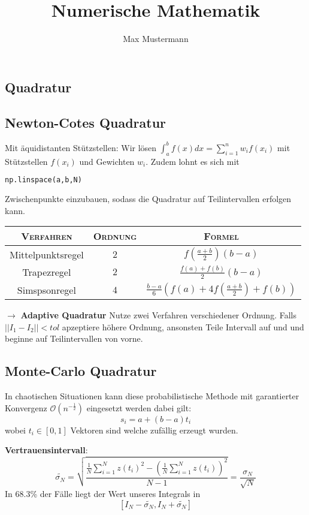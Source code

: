\documentclass{sciposter}
\title{\huge{Numerische Mathematik}}
\author{\large{Max Mustermann}}
\newcommand*\widefbox[1]{\fbox{\hspace{2em}#1\hspace{2em}}}
\begin{document}
\maketitle




\begin{multicols}{3}

\section{Quadratur}
\subsection*{Newton-Cotes Quadratur}
Mit äquidistanten Stützstellen: Wir lösen $\int_{a}^{b}f(x) dx = \sum_{i=1}^{n} w_i f(x_i)$ mit Stützstellen $f(x_i)$ und Gewichten $w_i$. Zudem lohnt es sich mit 
\begin{lstlisting}[language=Python]
np.linspace(a,b,N)
\end{lstlisting}
Zwischenpunkte einzubauen, sodass die Quadratur auf Teilintervallen erfolgen kann.

\begin{center}
	\renewcommand\arraystretch{2} \setlength\minrowclearance{2pt}
	\begin{tabular}{ c c c }
		\textsc{Verfahren} & \textsc{Ordnung} & \textsc{Formel} \\ \hline 
		Mittelpunktsregel & $2$ & $f(\frac{a+b}{2}) (b-a)$ \\   \hline
		Trapezregel & $2$ & $\frac{f(a) + f(b)}{2} (b-a)$ \\ \hline\textsl{}
		Simspsonregel & $4$ &  $\frac{b-a}{6} (f(a) + 4f(\frac{a+b}{2}) + f(b) )$  \\ \hline
	\end{tabular}
\end{center}
$\rightarrow$ \textbf{Adaptive Quadratur} Nutze zwei Verfahren verschiedener Ordnung. Falls $||I_1 - I_2|| < tol$ apzeptiere höhere Ordnung, ansonsten Teile Intervall auf und und beginne auf Teilintervallen von vorne. 

\subsection*{Monte-Carlo Quadratur}
In chaotischen Situationen kann diese probabilistische Methode mit garantierter Konvergenz $\mathcal{O}(n^{-\frac{1}{2}})$ eingesetzt werden dabei gilt: 
$$s_i = a + (b-a)t_i$$ wobei $t_i \in [0,1]$ Vektoren sind welche zufällig erzeugt wurden.
\textbf{Vertrauensintervall}:
$$\widetilde{\sigma_N} = \sqrt{\frac{\frac{1}{N} \sum_{i=1}^{N}z(t_i)^2 - (\frac{1}{N}\sum_{i=1}^{N} z(t_i))^2 }{N-1}} = \frac{\sigma_N}{\sqrt{N}}$$
In 68.3\% der Fälle liegt der Wert unseres Integrals in $$[I_N - \widetilde{\sigma_N}, I_N + \widetilde{\sigma_N}]$$


\end{multicols}
\end{document}
